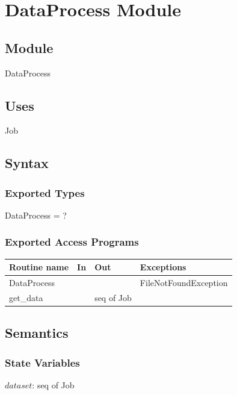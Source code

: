 \documentclass[12pt]{article}
\begin{document}
\section* {DataProcess Module}

\subsection*{Module}

DataProcess

\subsection* {Uses}

Job

\subsection* {Syntax}

\subsubsection* {Exported Types}

DataProcess = ?

\subsubsection* {Exported Access Programs}

\begin{tabular}{| l | l | l | l |}
\hline
\textbf{Routine name} & \textbf{In} & \textbf{Out} & \textbf{Exceptions}\\
\hline
DataProcess &~ & ~ &FileNotFoundException \\
\hline
get\_data &~ & seq of Job & \\
\hline

\end{tabular}

\subsection* {Semantics}

\subsubsection* {State Variables}

$dataset$: seq of Job\\
\end{document}
